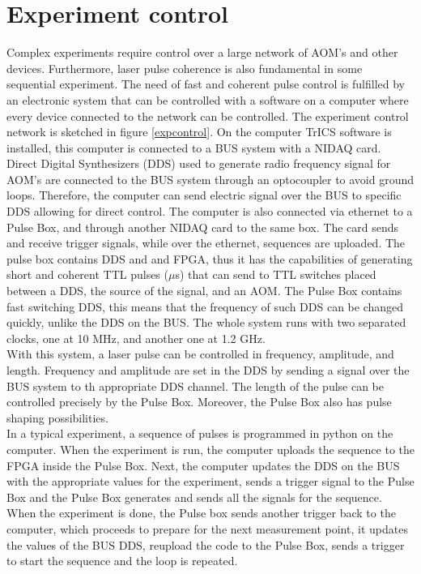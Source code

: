 \section{Experiment control}
Complex experiments require control over a large network of AOM's and other devices. Furthermore, laser pulse coherence is also fundamental in some sequential experiment. The need of fast and coherent pulse control is fulfilled by an electronic system that can be controlled with a software on a computer where every device connected to the network can be controlled. The experiment control network is sketched in figure \ref{expcontrol}. On the computer TrICS software is installed, this computer is connected to a BUS system with a NIDAQ card. Direct Digital Synthesizers (DDS) used to generate radio frequency signal for AOM's are connected to the BUS system through an optocoupler to avoid ground loops. Therefore, the computer can send electric signal over the BUS to specific DDS allowing for direct control. The computer is also connected via ethernet to a Pulse Box, and through another NIDAQ card to the same box. The card sends and receive trigger signals, while over the ethernet, sequences are uploaded. The pulse box contains DDS and and FPGA, thus it has the capabilities of generating short and coherent TTL pulses ($\mu$s) that can send to TTL switches placed between a DDS, the source of the signal, and an AOM. The Pulse Box contains fast switching DDS, this means that the frequency of such DDS can be changed quickly, unlike the DDS on the BUS. The whole system runs with two separated clocks, one at 10 MHz, and another one at 1.2 GHz.\\
With this system, a laser pulse can be controlled in frequency, amplitude, and length. Frequency and amplitude are set in the DDS by sending a signal over the BUS system to th appropriate DDS channel. The length of the pulse can be controlled precisely by the Pulse Box. Moreover, the Pulse Box also has pulse shaping possibilities.\\
In a typical experiment, a sequence of pulses is programmed in python on the computer. When the experiment is run, the computer uploads the sequence to the FPGA inside the Pulse Box. Next, the computer updates the DDS on the BUS with the appropriate values for the experiment, sends a trigger signal to the Pulse Box and the Pulse Box generates and sends all the signals for the sequence. When the experiment is done, the Pulse box sends another trigger back to the computer, which proceeds to prepare for the next measurement point, it updates the values of the BUS DDS, reupload the code to the Pulse Box, sends a trigger to start the sequence and the loop is repeated.

